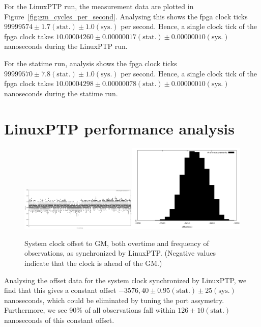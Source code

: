 \documentclass{article}
\begin{document}
For the LinuxPTP run, the measurement data are plotted in Figure~\ref{fig:gm_cycles_per_second}. Analysing this shows the fpga clock ticks $99999574\pm 1.7 (\text{stat.}) \pm 1.0 (\text{sys.})$ per second. Hence, a single clock tick of the fpga clock takes $10.00004260 \pm 0.00000017 (\text{stat.}) \pm 0.00000010 (\text{sys.})$ nanoseconds during the LinuxPTP run.

For the statime run, analysis shows the fpga clock ticks $ 99999570 \pm 7.8 (\text{stat.}) \pm 1.0 (\text{sys.})$ per second. Hence, a single clock tick of the fpga clock takes $10.00004298 \pm 0.00000078 (\text{stat.}) \pm 0.00000010 (\text{sys.})$ nanoseconds during the statime run.

\section {LinuxPTP performance analysis}

\begin{figure}[h]
\includegraphics[width=0.5\textwidth]{gm_ref_offset_overtime.pdf}\includegraphics[width=0.5\textwidth]{gm_ref_offset.pdf}
\caption{System clock offset to GM, both overtime and frequency of observations, as synchronized by LinuxPTP. (Negative values indicate that the clock is ahead of the GM.)}
\label{fig:ref_sys_offset}
\end{figure}

Analysing the offset data for the system clock synchronized by LinuxPTP, we find that this gives a constant offset $-3576,40\pm 0.95 (\text{stat.}) \pm 25(\text{sys.})$ nanoseconds, which could be eliminated by tuning the port assymetry. Furthermore, we see 90\% of all observations fall within $126 \pm 10 (\text{stat.})$ nanoseconds of this constant offset.
\end{document}
